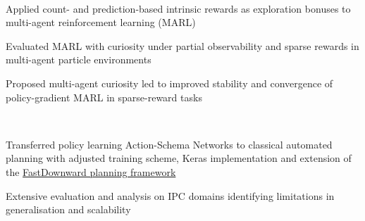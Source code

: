 \documentclass[]{lukas-cv-openfont}
\begin{document}

\noindent
{}
\\
\begin{tightitemize}{1.7em}
    \item Applied count- and prediction-based intrinsic rewards as exploration bonuses to multi-agent reinforcement learning (MARL)
    \item Evaluated MARL with curiosity under partial observability and sparse rewards in multi-agent particle environments
    \item Proposed multi-agent curiosity led to improved stability and convergence of policy-gradient MARL in sparse-reward tasks
\end{tightitemize}
\largesectionsep


\noindent
{}
\\
\begin{tightitemize}{1.7em}
    \item Transferred policy learning Action-Schema Networks to classical automated planning with adjusted training scheme, Keras implementation and extension of the \href{http://www.fast-downward.org}{FastDownward planning framework}
    \item Extensive evaluation and analysis on IPC domains identifying limitations in generalisation and scalability
\end{tightitemize}
\largesectionsep
\end{document}
